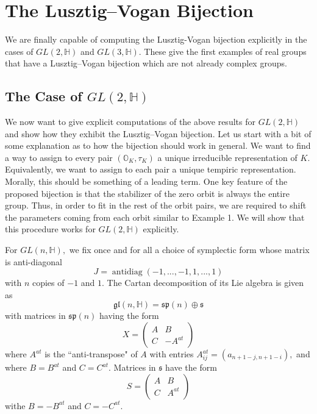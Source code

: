 \documentclass[letterpaper,twosided,11pt]{article}
\theoremstyle{plain}
\theoremstyle{definition}
\theoremstyle{remark}
\newcommand{\HH}{\mathbb{H}}
\newcommand{\OO}{\mathbb{O}}
\newcommand{\Mat}[1]{\begin{pmatrix}#1\end{pmatrix}}
\newcommand{\ds}{\oplus}
\newcommand{\lie}[1]{\mathfrak{#1}}
\begin{document}

\section{The Lusztig--Vogan Bijection}

We are finally capable of computing the Lusztig-Vogan bijection explicitly in the cases of $GL(2,\HH)$ and $GL(3,\HH).$ These give the first examples of real groups that have a Lusztig--Vogan bijection which are not already complex groups.  

\subsection{The Case of $ GL(2,\HH) $}

We now want to give explicit
computations of the above results for $ GL(2,\HH) $ and show how they
exhibit the Lusztig--Vogan bijection.  Let us start with a bit of some
explanation as to how the bijection should work in general.  We want to
find a way to assign to every pair $ (\OO_K,\tau_K) $ a unique
irreducible representation of $ K. $ Equivalently, we want to assign to
each pair a unique tempiric representation.  Morally, this should be
something of a leading term.  One key feature of the proposed bijection
is that the stabilizer of the zero orbit is always the entire group.
Thus, in order to fit in the rest of the orbit pairs, we are required to
shift the parameters coming from each orbit similar to Example 1.
We will show that this procedure works for $ GL(2,\HH) $ explicitly.

For $GL(n,\HH),$ we fix once and for all a choice of symplectic form whose 
matrix is anti-diagonal \[ J=\operatorname{antidiag}(-1,...,-1,1,...,1)\]
with $n$ copies of $-1$ and $1.$ The Cartan decomposition of its Lie algebra
is given as \[ \lie{gl}(n,\HH)=\lie{sp}(n)\ds \lie{s} \]
with matrices in $\lie{sp}(n)$ having the form \[ X=\Mat{ A& B \\ C & -A^{at}}\]
where $A^{at}$ is the ``anti-transpose" of $A$ with entries $A^{at}_{ij}=(a_{n+1-j,n+1-i}),$ 
and where $B=B^{at}$ and $C=C^{at}.$ Matrices in $\lie{s}$ have the form \[ S=\Mat{A & B \\ C & A^{at}}\]
withe $B=-B^{at}$ and $C=-C^{at}.$  
\end{document}
